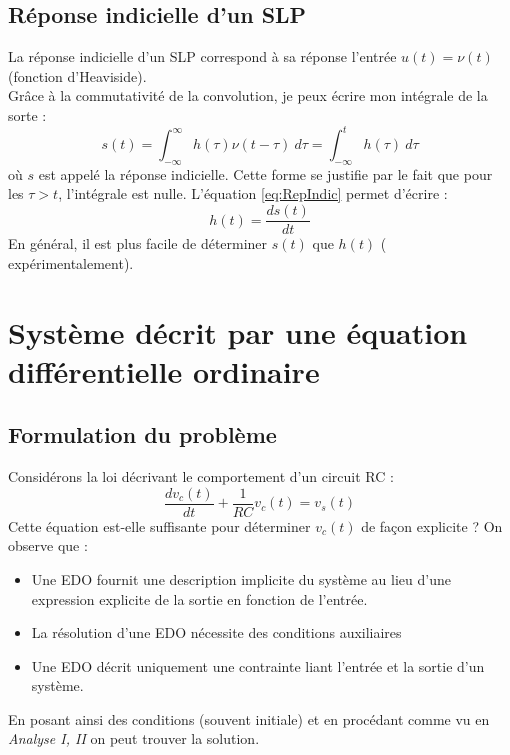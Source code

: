 \subsection{Réponse indicielle d'un SLP}
La réponse indicielle d'un SLP correspond à sa réponse l'entrée $u(t) = \nu
(t)$ (fonction d'Heaviside).\\
Grâce à la commutativité de la convolution, je peux écrire mon intégrale de
la sorte :
\begin{equation}
	s(t) = \int_{-\infty}^\infty h(\tau)\nu(t-\tau)\ d\tau = \int_{-\infty}^t h(
	\tau)\ d\tau
	\label{eq:RepIndic}
\end{equation}
où $s$ est appelé la réponse indicielle. Cette forme se justifie par le fait que 
pour les $\tau > t$, l'intégrale est nulle. L'équation \autoref{eq:RepIndic} 
permet d'écrire :
\begin{equation}
	h(t) = \frac{ds(t)}{dt}
\end{equation}
En général, il est plus facile de déterminer $s(t)$ que $h(t)$ (
expérimentalement).


\section{Système décrit par une équation différentielle ordinaire}
\subsection{Formulation du problème}
Considérons la loi décrivant le comportement d'un circuit RC :
\begin{equation}
	\frac{dv_c(t)}{dt}+\frac{1}{RC}v_c(t) = v_s(t)
\end{equation}		
Cette équation est-elle suffisante pour déterminer $v_c(t)$ de façon 
explicite ? On observe que :
\begin{itemize}
	\item Une EDO fournit une description implicite du système au lieu d'une 
	      expression explicite de la sortie en fonction de l'entrée.
	\item La résolution d'une EDO nécessite des conditions auxiliaires
	\item Une EDO décrit uniquement une contrainte liant l'entrée et la
	      sortie d'un système.
\end{itemize}
En posant ainsi des conditions (souvent initiale) et en procédant 
comme vu en \textit{Analyse I, II} on peut trouver la solution.
	
